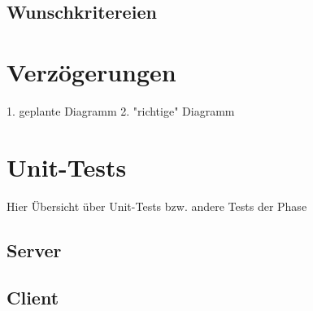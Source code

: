 \documentclass{scrartcl}
\begin{document}
	\subsection{Wunschkritereien}
	
	\newpage
	\section{Verzögerungen}
	1. geplante Diagramm
	2. "richtige" Diagramm
	
	\newpage
	\section{Unit-Tests}
	Hier Übersicht über Unit-Tests bzw. andere Tests der Phase
	\subsection{Server}
	\subsection{Client}
	
\end{document}
